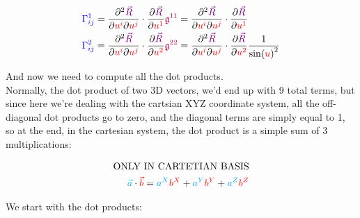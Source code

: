 \begin{align*}
    \begingroup\color{blue}\Gamma^{1}_{ij}\endgroup &= \frac{\partial^2 \begingroup\color{violet}\vec{R}\endgroup}{\partial \begingroup\color{red}u^i\endgroup \partial\begingroup\color{red}u^j\endgroup} \cdot \frac{\partial \begingroup\color{violet}\vec{R}\endgroup}{\partial \begingroup\color{red}u^1\endgroup} \begingroup\color{purple}\mathfrak{g}^{11}\endgroup = 
    \frac{\partial^2 \begingroup\color{violet}\vec{R}\endgroup}{\partial \begingroup\color{red}u^i\endgroup \partial\begingroup\color{red}u^j\endgroup} \cdot \frac{\partial \begingroup\color{violet}\vec{R}\endgroup}{\partial \begingroup\color{red}u^1\endgroup}\\
    \begingroup\color{blue}\Gamma^{2}_{ij}\endgroup &=
    \frac{\partial^2 \begingroup\color{violet}\vec{R}\endgroup}{\partial \begingroup\color{red}u^i\endgroup \partial\begingroup\color{red}u^j\endgroup} \cdot \frac{\partial \begingroup\color{violet}\vec{R}\endgroup}{\partial \begingroup\color{red}u^2\endgroup} \begingroup\color{purple}\mathfrak{g}^{22}\endgroup = 
    \frac{\partial^2 \begingroup\color{violet}\vec{R}\endgroup}{\partial \begingroup\color{red}u^i\endgroup \partial\begingroup\color{red}u^j\endgroup} \cdot \frac{\partial \begingroup\color{violet}\vec{R}\endgroup}{\partial \begingroup\color{red}u^2\endgroup} \frac{1}{\sin(\begingroup\color{red}u\endgroup)^2}
\end{align*}

And now we need to compute all the dot products.\\
Normally, the dot product of two 3D vectors, we'd end up with 9 total terms, but since here we're dealing with the cartsian XYZ coordinate system, all the off-diagonal dot products go to zero, and the
diagonal terms are simply equal to 1, so at the end, in the cartesian system, the dot product is a simple sum of 3 multiplications:

\begin{align*}
    \text{ONLY IN CARTETIAN BASIS}\\
    \begingroup\color{cyan}\vec{a}\endgroup \cdot \begingroup\color{red}\vec{b}\endgroup = \begingroup\color{cyan}a^X\endgroup\begingroup\color{red}b^X\endgroup
    + \begingroup\color{cyan}a^Y\endgroup\begingroup\color{red}b^Y\endgroup
    + \begingroup\color{cyan}a^Z\endgroup\begingroup\color{red}b^Z\endgroup
\end{align*}

We start with the dot products:

